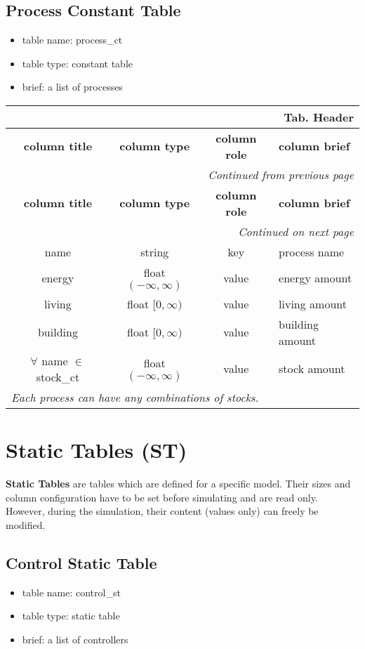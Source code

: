 \documentclass[a4paper,oneside,titlepage]{report}
\newcommand*{\LTHeaderIV}[5]{
  \multicolumn{4}{r}{\textbf{Tab. \thesubsection} \textbf{#1}}\\    
  \hline
  \textbf{#2} & \textbf{#3} & \textbf{#4} & \textbf{#5}\\
  \hline
  
  \endfirsthead
  \multicolumn{4}{r}{\textit{Continued from previous page}}\\    
  \hline
  \textbf{#2} & \textbf{#3} & \textbf{#4} & \textbf{#5}\\
  \hline
  \endhead
  \hline
  \multicolumn{4}{r}{\textit{Continued on next page}}\\
  \endfoot
  \hline
  \endlastfoot  
}
\begin{document}
\subsection{Process Constant Table}
\begin{itemize}
  \setlength{\itemsep}{0pt}
  \setlength{\parskip}{0pt}
\item table name: process\_ct  
\item table type: constant table   
\item brief: a list of processes
\end{itemize}

\vspace{-0.5cm}
\begin{longtable}{ |c|c|c|l| } 
  \LTHeaderIV{Header}{column title}{column type}{column role}{column brief}                    
  name & string & key & process name\\
  energy & float $(-\infty, \infty)$ & value & energy amount \\
  living & float $[0, \infty)$ & value & living amount \\
  building & float $[0, \infty)$ & value & building  amount \\
  $\forall$ name $\in$ stock\_ct & float $(-\infty, \infty)$ & value & stock amount\\
  \multicolumn{4}{|l|}{\textit{Each process can have any combinations of stocks.}}\\
\end{longtable}        

\section{Static Tables (ST)}
\textbf{Static Tables} are tables which are defined for a specific model. Their sizes and column configuration have to be set before simulating and are read only. However, during the simulation, their content (values only) can freely be modified.

\subsection{Control Static Table}
\begin{itemize}
  \setlength{\itemsep}{0pt}
  \setlength{\parskip}{0pt}
\item table name: control\_st  
\item table type: static table   
\item brief: a list of controllers
\end{itemize}
\end{document}
